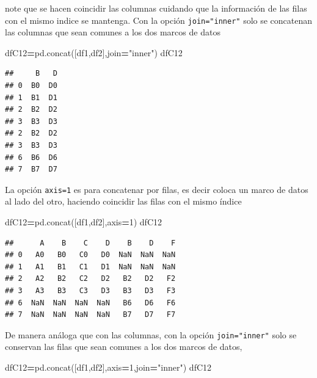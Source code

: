 \documentclass[
]{book}
\newenvironment{Shaded}{\begin{snugshade}}{\end{snugshade}}
\newcommand{\DecValTok}[1]{\textcolor[rgb]{0.00,0.00,0.81}{#1}}
\newcommand{\NormalTok}[1]{#1}
\newcommand{\OperatorTok}[1]{\textcolor[rgb]{0.81,0.36,0.00}{\textbf{#1}}}
\newcommand{\StringTok}[1]{\textcolor[rgb]{0.31,0.60,0.02}{#1}}
\theoremstyle{definition}
\theoremstyle{definition}
\theoremstyle{definition}
\theoremstyle{definition}
\theoremstyle{remark}
\begin{document}
note que se hacen coincidir las columnas cuidando que la información de las filas con el mismo indice se mantenga. Con la opción \texttt{join="inner"} solo se concatenan las columnas que sean comunes a los dos marcos de datos

\begin{Shaded}
\begin{Highlighting}[]
\NormalTok{dfC12}\OperatorTok{=}\NormalTok{pd.concat([df1,df2],join}\OperatorTok{=}\StringTok{"inner"}\NormalTok{)   }
\NormalTok{dfC12}
\end{Highlighting}
\end{Shaded}

\begin{verbatim}
##     B   D
## 0  B0  D0
## 1  B1  D1
## 2  B2  D2
## 3  B3  D3
## 2  B2  D2
## 3  B3  D3
## 6  B6  D6
## 7  B7  D7
\end{verbatim}

La opción \texttt{axis=1} es para concatenar por filas, es decir coloca un marco de datos al lado del otro, haciendo coincidir las filas con el mismo índice

\begin{Shaded}
\begin{Highlighting}[]
\NormalTok{dfC12}\OperatorTok{=}\NormalTok{pd.concat([df1,df2],axis}\OperatorTok{=}\DecValTok{1}\NormalTok{) }
\NormalTok{dfC12}
\end{Highlighting}
\end{Shaded}

\begin{verbatim}
##      A    B    C    D    B    D    F
## 0   A0   B0   C0   D0  NaN  NaN  NaN
## 1   A1   B1   C1   D1  NaN  NaN  NaN
## 2   A2   B2   C2   D2   B2   D2   F2
## 3   A3   B3   C3   D3   B3   D3   F3
## 6  NaN  NaN  NaN  NaN   B6   D6   F6
## 7  NaN  NaN  NaN  NaN   B7   D7   F7
\end{verbatim}

De manera análoga que con las columnas, con la opción \texttt{join="inner"} solo se conservan las filas que sean comunes a los dos marcos de datos,

\begin{Shaded}
\begin{Highlighting}[]
\NormalTok{dfC12}\OperatorTok{=}\NormalTok{pd.concat([df1,df2],axis}\OperatorTok{=}\DecValTok{1}\NormalTok{,join}\OperatorTok{=}\StringTok{"inner"}\NormalTok{) }
\NormalTok{dfC12}
\end{Highlighting}
\end{Shaded}
\end{document}

